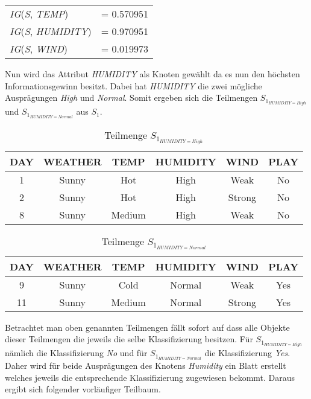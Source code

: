 \begin{table}[htbp]
    \centering
    \begin{tabular}{lc}
        \textit{IG}(\textit{S}, \textit{TEMP})     &= 0.570951 \\
        \textit{IG}(\textit{S}, \textit{HUMIDITY}) &= 0.970951 \\
        \textit{IG}(\textit{S}, \textit{WIND})     &= 0.019973 \\
    \end{tabular}
\end{table}

Nun wird das Attribut \textit{HUMIDITY} als Knoten gewählt da es nun den höchsten Informationsgewinn besitzt. Dabei hat \textit{HUMIDITY} die zwei mögliche Ausprägungen \textit{High} und \textit{Normal}. Somit ergeben sich die Teilmengen $S_{1_{HUMIDITY=High}}$ und $S_{1_{HUMIDITY=Normal}}$ aus $S_{1}$.

\begin{table}[H]
    \centering
    \begin{tabular}{cccccc}
        \toprule
        \textbf{DAY} & \textbf{WEATHER} & \textbf{TEMP} & \textbf{HUMIDITY} & \textbf{WIND} & \textbf{PLAY} \\
        \toprule
        1   &Sunny	&Hot	&High	&Weak	&No  \\
        2   &Sunny	&Hot	&High	&Strong	&No  \\
        8   &Sunny	&Medium	&High	&Weak	&No  \\
        \bottomrule
    \end{tabular}
    \caption{Teilmenge $S_{1_{HUMIDITY=High}}$}
    \label{table:datensatz-humidity-high}
\end{table}
\begin{table}[H]
    \centering
    \begin{tabular}{cccccc}
        \toprule
        \textbf{DAY} & \textbf{WEATHER} & \textbf{TEMP} & \textbf{HUMIDITY} & \textbf{WIND} & \textbf{PLAY} \\
        \toprule
        9   &Sunny	&Cold	&Normal	&Weak	&Yes \\
        11  &Sunny	&Medium	&Normal	&Strong	&Yes \\
        \bottomrule
    \end{tabular}
    \caption{Teilmenge $S_{1_{HUMIDITY=Normal}}$}
    \label{table:datensatz-humidity-normal}
\end{table}

Betrachtet man oben genannten Teilmengen fällt sofort auf dass alle Objekte dieser Teilmengen die jeweils die selbe Klassifizierung besitzen. Für $S_{1_{HUMIDITY=High}}$ nämlich die Klassifizierung \textit{No} und für $S_{1_{HUMIDITY=Normal}}$ die Klassifizierung \textit{Yes}. Daher wird für beide Ausprägungen des Knotens \textit{Humidity} ein Blatt erstellt welches jeweils die entsprechende Klassifizierung zugewiesen bekommt. Daraus ergibt sich folgender vorläufiger Teilbaum.


